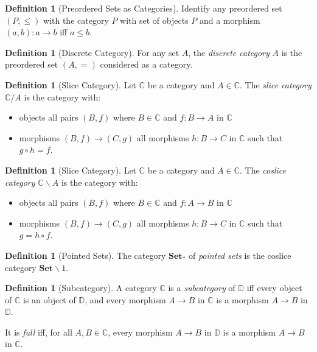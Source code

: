 \documentclass{article}
\theoremstyle{definition}
\newtheorem{definition}[axiom]{Definition}
\begin{document}
\begin{definition}[Preordered Sets as Categories]
    Identify any preordered set $(P,\leq)$ with the category $P$ with set of objects $P$
    and a morphism $(a,b) : a \rightarrow b$ iff $a \leq b$.
\end{definition}

\begin{definition}[Discrete Category]
    For any set $A$, the \emph{discrete category} $A$ is the preordered set $(A, =)$
    considered as a category.
\end{definition}

\begin{definition}[Slice Category]
    Let $\mathbb{C}$ be a category and $A \in \mathbb{C}$. The \emph{slice category}
    $\mathbb{C} / A$ is the category with:
    \begin{itemize}
        \item objects all pairs $(B,f)$ where $B \in \mathbb{C}$ and $f : B \rightarrow A$
        in $\mathbb{C}$
        \item morphisms $(B,f) \rightarrow (C,g)$ all morphisms $h : B \rightarrow C$
        in $\mathbb{C}$ such that $g \circ h = f$.
    \end{itemize}
\end{definition}

\begin{definition}[Slice Category]
    Let $\mathbb{C}$ be a category and $A \in \mathbb{C}$. The \emph{coslice category}
    $\mathbb{C} \backslash A$ is the category with:
    \begin{itemize}
        \item objects all pairs $(B,f)$ where $B \in \mathbb{C}$ and $f : A \rightarrow B$
        in $\mathbb{C}$
        \item morphisms $(B,f) \rightarrow (C,g)$ all morphisms $h : B \rightarrow C$
        in $\mathbb{C}$ such that $g = h \circ f$.
    \end{itemize}
\end{definition}

\begin{definition}[Pointed Sets]
    The category $\mathbf{Set}_*$ of \emph{pointed sets} is the coslice category
    $\mathbf{Set} \backslash 1$.
\end{definition}

\begin{definition}[Subcategory]
    A category $\mathbb{C}$ is a \emph{subcategory} of $\mathbb{D}$ iff every object
    of $\mathbb{C}$ is an object of $\mathbb{D}$, and every morphism $A \rightarrow B$
    in $\mathbb{C}$ is a morphism $A \rightarrow B$ in $\mathbb{D}$.

    It is \emph{full} iff, for all $A, B \in \mathbb{C}$, every morphism $A \rightarrow B$
    in $\mathbb{D}$ is a morphism $A \rightarrow B$ in $\mathbb{C}$.
\end{definition}
\end{document}
